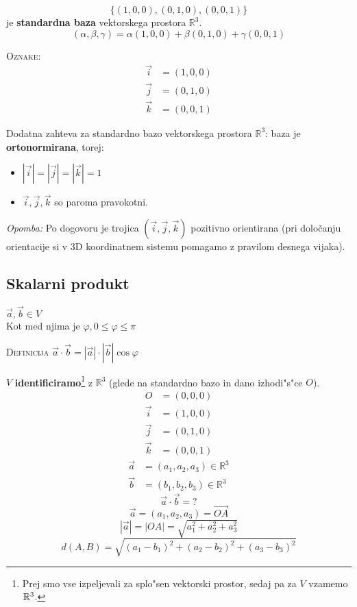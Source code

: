 \[\{(1, 0, 0), (0, 1, 0), (0, 0, 1)\}\] je \textbf{standardna baza} vektorskega prostora \(\mathbb{R}^3\).
\[(\alpha, \beta, \gamma) = \alpha(1, 0, 0) + \beta(0, 1, 0) + \gamma(0, 0, 1)\]

\textsc{Oznake:}
\begin{align*}
	\vec{i} &= (1, 0, 0)\\
	\vec{j} &= (0, 1, 0)\\
	\vec{k} &= (0, 0, 1)
\end{align*}

Dodatna zahteva za standardno bazo vektorskega prostora \(\mathbb{R}^3\):
\hspace*{12pt}baza je \textbf{ortonormirana}, torej:
\begin{itemize}
	\item \(|\vec{i}| = |\vec{j}| = |\vec{k}| = 1\)
	\item \(\vec{i}, \vec{j}, \vec{k}\) so paroma pravokotni.
\end{itemize}
\emph{Opomba:} Po dogovoru je trojica $(\vec{i}, \vec{j}, \vec{k})$ pozitivno orientirana (pri določanju orientacije si v 3D koordinatnem sistemu pomagamo z pravilom desnega vijaka).

\subsection{Skalarni produkt}
\(\vec{a}, \vec{b} \in V\)\\
Kot med njima je \(\varphi, 0 \leq \varphi \leq \pi\)

\textsc{Definicija} \(\vec{a} \cdot \vec{b} = |\vec{a}| \cdot |\vec{b}| \cos\varphi\)

\(V\) \textbf{identificiramo}\footnote{Prej smo vse izpeljevali za splo"sen vektorski prostor, sedaj pa za $V$ vzamemo $\mathbb{R}^3$.} z \(\mathbb{R}^3\) (glede na standardno bazo in dano izhodi"s"ce \(O\)).
\begin{align*}
	O &= (0, 0, 0)\\
	\vec{i} &= (1, 0, 0)\\
	\vec{j} &= (0, 1, 0)\\
	\vec{k} &= (0, 0, 1)
\end{align*}
\begin{align*}
	\vec{a} &= (a_1, a_2, a_3) \in \mathbb{R}^3\\
	\vec{b} &= (b_1, b_2, b_3) \in \mathbb{R}^3
\end{align*}
\[\vec{a} \cdot \vec{b} = ?\]
\[\vec{a} = (a_1, a_2, a_3) = \vec{OA}\]
\[|\vec{a}| = |OA| = \sqrt{a_1^2 + a_2^2 + a_3^2}\]
\[d(A, B) = \sqrt{(a_1 - b_1)^2 + (a_2 - b_2)^2 + (a_3 - b_3)^2}\]


